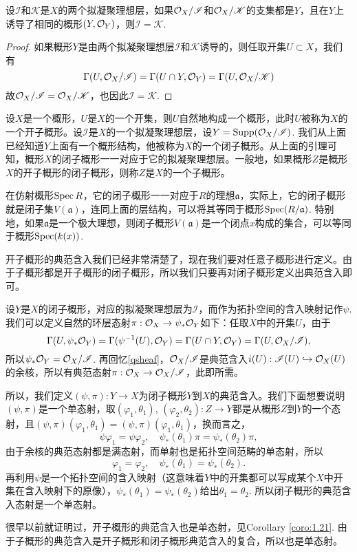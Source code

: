 \begin{lem}
设$\mathscr{I}$和$\mathscr{K}$是$X$的两个拟凝聚理想层，如果$\mathcal{O}_X/\mathscr{I}$和$\mathcal{O}_X/\mathscr{K}$的支集都是$Y$，且在$Y$上诱导了相同的概形$(Y,\mathcal{O}_Y)$，则$\mathscr{I}=\mathscr{K}$.
\end{lem}

\begin{proof}
如果概形$Y$是由两个拟凝聚理想层$\mathscr{I}$和$\mathscr{K}$诱导的，则任取开集$U\subset X$，我们有
\[
	\Gamma(U,\mathcal{O}_X/\mathscr{I})=\Gamma(U\cap Y,\mathcal{O}_Y)=\Gamma(U,\mathcal{O}_X/\mathscr{K})
\]
故$\mathcal{O}_X/\mathscr{I}=\mathcal{O}_X/\mathscr{K}$，也因此$\mathscr{I}=\mathscr{K}$.
\end{proof}

\begin{para}[子概形]
设$X$是一个概形，$U$是$X$的一个开集，则$U$自然地构成一个概形，此时$U$被称为$X$的一个开子概形。设$\mathscr{I}$是$X$的一个拟凝聚理想层，设$Y=\mathrm{Supp}(\mathcal{O}_X/\mathscr{I})$. 我们从上面已经知道$Y$上面有一个概形结构，他被称为$X$的一个闭子概形。从上面的引理可知，概形$X$的闭子概形一一对应于它的拟凝聚理想层。一般地，如果概形$Z$是概形$X$的开子概形的闭子概形，则称$Z$是$X$的一个子概形。

在仿射概形$\operatorname{Spec} R$，它的闭子概形一一对应于$R$的理想$\mathfrak a$，实际上，它的闭子概形就是闭子集$V(\mathfrak a)$，连同上面的层结构，可以将其等同于概形$\operatorname{Spec}(R/\mathfrak a)$. 特别地，如果$\mathfrak a$是一个极大理想，则闭子概形$V(\mathfrak a)$是一个闭点$x$构成的集合，可以等同于概形$\operatorname{Spec}(k(x))$.
\end{para}

\begin{para}[子概形的典范含入]
开子概形的典范含入我们已经非常清楚了，现在我们要对任意子概形进行定义。由于子概形都是开子概形的闭子概形，所以我们只要再对闭子概形定义出典范含入即可。

设$Y$是$X$的闭子概形，对应的拟凝聚理想层为$\mathscr I$，而作为拓扑空间的含入映射记作$\psi$. 我们可以定义自然的环层态射$\pi:\mathcal{O}_X\to \psi_*\mathcal{O}_Y$如下：任取$X$中的开集$U$，由于
\[
	\Gamma(U,\psi_*\mathcal{O}_Y)=\Gamma(\psi^{-1}(U),\mathcal{O}_Y)=\Gamma(U\cap Y,\mathcal{O}_Y)=\Gamma(U,\mathcal{O}_X/\mathscr I),
\]
所以$\psi_*\mathcal{O}_Y=\mathcal{O}_X/\mathscr I$. 再回忆\ref{qsheaf}，$\mathcal{O}_X/\mathscr I$是典范含入$i(U):\mathscr I(U)\hookrightarrow \mathcal{O}_X(U)$的余核，所以有典范态射$\pi:\mathcal{O}_X\to \mathcal{O}_X/\mathscr I$，此即所需。

所以，我们定义$(\psi,\pi):Y\to X$为闭子概形$Y$到$X$的典范含入。我们下面想要说明$(\psi,\pi)$是一个单态射，取$(\varphi_1,\theta_1)$, $(\varphi_2,\theta_2):Z\to Y$都是从概形$Z$到$Y$的一个态射，且$(\psi,\pi)(\varphi_1,\theta_1)=(\psi,\pi)(\varphi_1,\theta_1)$，换而言之，
\[
	\psi\varphi_1=\psi\varphi_2,\quad \psi_*(\theta_1)\pi=\psi_*(\theta_2)\pi,
\]
由于余核的典范态射都是满态射，而单射也是拓扑空间范畴的单态射，所以
\[
	\varphi_1=\varphi_2,\quad \psi_*(\theta_1)=\psi_*(\theta_2).
\]
再利用$\psi$是一个拓扑空间的含入映射（这意味着$Y$中的开集都可以写成某个$X$中开集在含入映射下的原像），$\psi_*(\theta_1)=\psi_*(\theta_2)$给出$\theta_1=\theta_2$. 所以闭子概形的典范含入态射是一个单态射。

很早以前就证明过，开子概形的典范含入也是单态射，见Corollary \ref{coro:1.21}. 由于子概形的典范含入是开子概形和闭子概形典范含入的复合，所以也是单态射。
\end{para}

